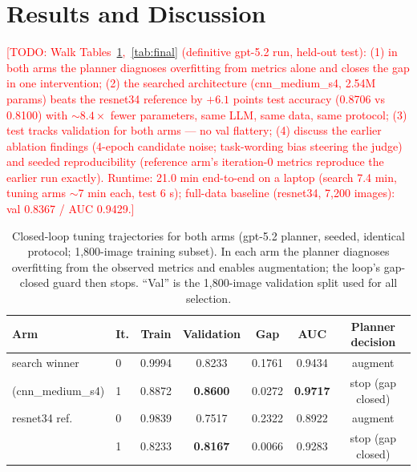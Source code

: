 \documentclass{article}
\newcommand{\todo}[1]{\textcolor{red}{[TODO: #1]}}
\begin{document}
\section{Results and Discussion}
\label{sec:results}
\todo{Walk Tables~\ref{tab:planner},~\ref{tab:final} (definitive gpt-5.2 run,
held-out test): (1) in both arms the planner diagnoses overfitting from metrics
alone and closes the gap in one intervention; (2) the searched architecture
(cnn\_medium\_s4, 2.54M params) beats the resnet34 reference by $+6.1$ points test
accuracy (0.8706 vs 0.8100) with ${\sim}8.4\times$ fewer parameters, same LLM,
same data, same protocol; (3) test tracks validation for both arms — no val
flattery; (4) discuss the earlier ablation findings (4-epoch candidate noise;
task-wording bias steering the judge) and seeded reproducibility (reference arm's
iteration-0 metrics reproduce the earlier run exactly). Runtime: 21.0 min
end-to-end on a laptop (search 7.4 min, tuning arms $\sim$7 min each, test 6 s);
full-data baseline (resnet34, 7{,}200 images): val 0.8367 / AUC 0.9429.}

\begin{table}[t]
  \caption{Closed-loop tuning trajectories for both arms (gpt-5.2 planner, seeded,
  identical protocol; 1{,}800-image training subset). In each arm the planner
  diagnoses overfitting from the observed metrics and enables augmentation; the
  loop's gap-closed guard then stops. ``Val'' is the 1{,}800-image validation split
  used for all selection.}
  \label{tab:planner}
  \centering
  \small
  \begin{tabular}{llccccc}
    \toprule
    Arm & It. & Train & Validation & Gap & AUC & Planner decision \\
    \midrule
    search winner & 0 & 0.9994 & 0.8233 & 0.1761 & 0.9434 & augment \\
    (cnn\_medium\_s4) & 1 & 0.8872 & \textbf{0.8600} & 0.0272 & \textbf{0.9717} & stop (gap closed) \\
    \midrule
    resnet34 ref. & 0 & 0.9839 & 0.7517 & 0.2322 & 0.8922 & augment \\
    & 1 & 0.8233 & \textbf{0.8167} & 0.0066 & 0.9283 & stop (gap closed) \\
    \bottomrule
  \end{tabular}
\end{table}
\end{document}
